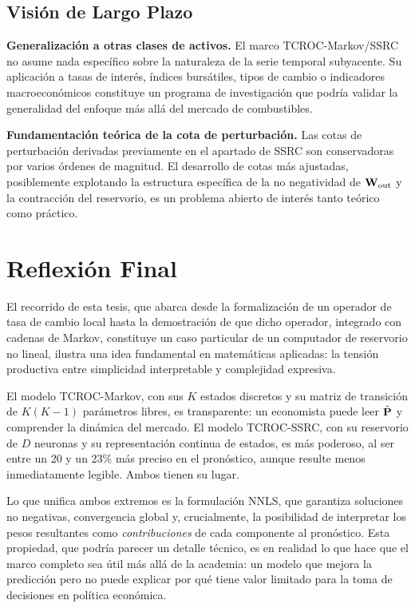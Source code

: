 \subsection{Visión de Largo Plazo}

\textbf{Generalización a otras clases de activos.}  El marco
TCROC-Markov/SSRC no asume nada específico sobre la naturaleza de
la serie temporal subyacente.  Su aplicación a tasas de interés,
índices bursátiles, tipos de cambio o indicadores macroeconómicos
constituye un programa de investigación que podría validar la
generalidad del enfoque más allá del mercado de combustibles.

\textbf{Fundamentación teórica de la cota de perturbación.}  Las
cotas de perturbación derivadas previamente en el apartado de SSRC
son conservadoras por varios órdenes de magnitud.  El desarrollo de
cotas más ajustadas, posiblemente explotando la estructura específica
de la no negatividad de $\mathbf{W}_{\text{out}}$ y la contracción del
reservorio, es un problema abierto de interés tanto teórico como
práctico.

\section{Reflexión Final}
\label{sec:reflexion_final}

El recorrido de esta tesis, que abarca desde la formalización de un operador
de tasa de cambio local hasta la demostración de que dicho operador,
integrado con cadenas de Markov, constituye un caso particular de un
computador de reservorio no lineal, ilustra una idea fundamental
en matemáticas aplicadas: la tensión productiva entre simplicidad
interpretable y complejidad expresiva.

El modelo TCROC-Markov, con sus $K$ estados discretos y su matriz
de transición de $K(K-1)$ parámetros libres, es transparente: un
economista puede leer $\hat{\mathbf{P}}$ y comprender la dinámica del
mercado.  El modelo TCROC-SSRC, con su reservorio de $D$ neuronas y
su representación continua de estados, es más poderoso, al ser entre un 20 y un 23\%
más preciso en el pronóstico, aunque resulte menos inmediatamente legible.
Ambos tienen su lugar.

Lo que unifica ambos extremos es la formulación NNLS, que garantiza
soluciones no negativas, convergencia global y, crucialmente, la
posibilidad de interpretar los pesos resultantes como
\emph{contribuciones} de cada componente al pronóstico.  Esta
propiedad, que podría parecer un detalle técnico, es en realidad lo
que hace que el marco completo sea útil más allá de la academia:
un modelo que mejora la predicción pero no puede explicar por qué
tiene valor limitado para la toma de decisiones en política
económica.

